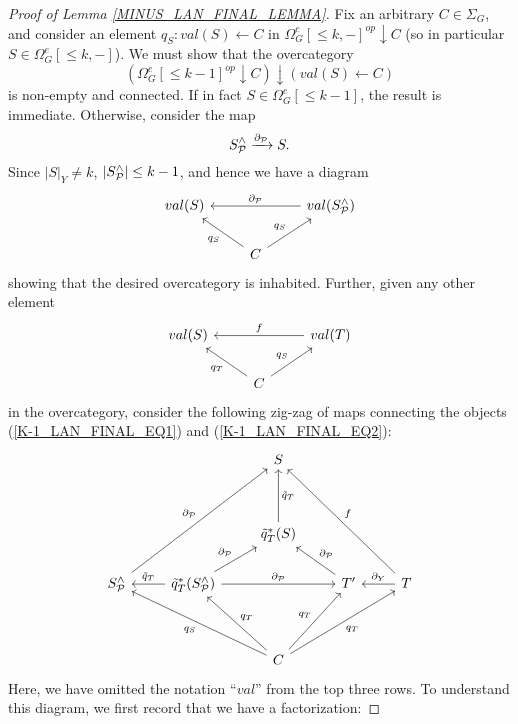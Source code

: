 \documentclass[a4paper,10pt]{article}%
\begin{document}
\begin{proof}[Proof of Lemma \ref{MINUS_LAN_FINAL_LEMMA}]
  Fix an arbitrary $C\in \Sigma_G$, and consider an element $q_S: val(S) \leftarrow C$ in $\Omega_G^{e}[\leq k, -]^{op} \downarrow C$ (so in particular $S \in \Omega_G^e[\leq k,-]$). We must show that the overcategory 
  \[
  (\Omega_G^e[\leq k-1]^{op} \downarrow C) \downarrow (val(S) \leftarrow C)
  \]
  is non-empty and connected. 
  If in fact $S\in \Omega_G^e[\leq k-1]$, the result is immediate. Otherwise, consider the map 
  \[
  S^{\wedge}_\P \xrightarrow{\partial_\P} S.
  \]
  Since $|S|_Y \neq k$, $|S^\wedge_\P| \leq k-1$, and hence we have a diagram
  \begin{equation}
    \label{K-1_LAN_FINAL_EQ1}
    \begin{tikzcd}
      val(S) && val(S^\wedge_\P) \arrow[ll, "\partial_\P"']\\
      & C \arrow[ur, "q_S"] \arrow[ul, "q_S"]
    \end{tikzcd}
  \end{equation}
  showing that the desired overcategory is inhabited. Further, given any other element
  \begin{equation}
    \label{K-1_LAN_FINAL_EQ2}
    \begin{tikzcd}
      val(S) && val(T) \arrow[ll, "f"']\\
      & C \arrow[ur, "q_S"] \arrow[ul, "q_T"]
    \end{tikzcd}
  \end{equation}
  in the overcategory, consider the following zig-zag of maps connecting the objects (\ref{K-1_LAN_FINAL_EQ1}) and (\ref{K-1_LAN_FINAL_EQ2}):
  \begin{equation}
    \label{K-1_LAN_FINAL_DIAGRAM}
    \begin{tikzcd}
      && S &&\\[20pt]
      && \tilde q_T^*(S) \arrow[u, "\tilde q_T"'] &&\\
      S^\wedge_\P \arrow[uurr, "\partial_\P"] & \tilde q_T^*(S^\wedge_\P) \arrow[l, "\tilde q_T"'] \arrow[ur, "\partial_\P"] \arrow[rr, "\partial_\P"] && T' \arrow[ul, "\partial_\P"'] & T \arrow[l, "\partial_Y"'] \arrow[uull, "f"']\\[20pt]
      && C \arrow[ull, "q_S"] \arrow[ul, "q_T"'] \arrow[ur, "q_T"] \arrow[urr, "q_T"'] 
    \end{tikzcd}
  \end{equation}
  Here, we have omitted the notation ``$val$'' from the top three rows. To understand this diagram, we first record that we have a factorization:

\end{proof}
\end{document}
